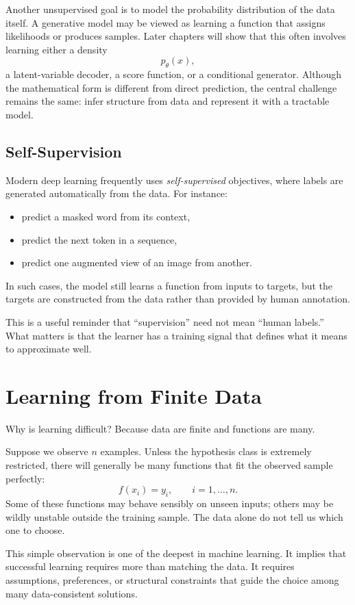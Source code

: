 Another unsupervised goal is to model the probability distribution of the data itself. A generative model may be viewed as learning a function that assigns likelihoods or produces samples. Later chapters will show that this often involves learning either a density
\[
p_\theta(x),
\]
a latent-variable decoder, a score function, or a conditional generator. Although the mathematical form is different from direct prediction, the central challenge remains the same: infer structure from data and represent it with a tractable model.

\subsection{Self-Supervision}

Modern deep learning frequently uses \emph{self-supervised} objectives, where labels are generated automatically from the data. For instance:
\begin{itemize}
    \item predict a masked word from its context,
    \item predict the next token in a sequence,
    \item predict one augmented view of an image from another.
\end{itemize}
In such cases, the model still learns a function from inputs to targets, but the targets are constructed from the data rather than provided by human annotation.

This is a useful reminder that ``supervision'' need not mean ``human labels.'' What matters is that the learner has a training signal that defines what it means to approximate well.

\section{Learning from Finite Data}

Why is learning difficult? Because data are finite and functions are many.

Suppose we observe $n$ examples. Unless the hypothesis class is extremely restricted, there will generally be many functions that fit the observed sample perfectly:
\[
f(x_i)=y_i, \qquad i=1,\dots,n.
\]
Some of these functions may behave sensibly on unseen inputs; others may be wildly unstable outside the training sample. The data alone do not tell us which one to choose.

This simple observation is one of the deepest in machine learning. It implies that successful learning requires more than matching the data. It requires assumptions, preferences, or structural constraints that guide the choice among many data-consistent solutions.

